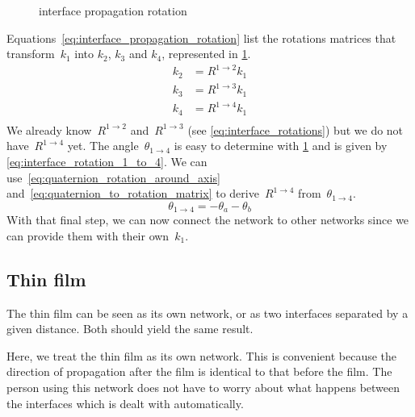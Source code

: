 \begin{figure}[hbtp]
    \centering
    \caption{\label{fig:interface_propagation_rotation}interface propagation rotation}
\end{figure}
Equations~\eqref{eq:interface_propagation_rotation} list the rotations matrices that transform~$k_1$ into $k_2$, $k_3$ and $k_4$, represented in \cref{fig:interface_propagation_rotation}.
\begin{equation}
    \begin{aligned}
        k_2 &= R^{1 \rightarrow 2} k_1 \\
        k_3 &= R^{1 \rightarrow 3} k_1 \\
        k_4 &= R^{1 \rightarrow 4} k_1 \\
    \end{aligned}
    \label{eq:interface_propagation_rotation}
\end{equation}
We already know~$R^{1 \rightarrow 2}$ and~$R^{1 \rightarrow 3}$ (see \cref{eq:interface_rotations}) but we do not have~$R^{1 \rightarrow 4}$ yet.
The angle~$\theta_{1 \rightarrow 4}$ is easy to determine with \cref{fig:interface_propagation_rotation} and is given by \cref{eq:interface_rotation_1_to_4}.
We can use~\cref{eq:quaternion_rotation_around_axis} and~\cref{eq:quaternion_to_rotation_matrix} to derive~$R^{1 \rightarrow 4}$ from~$\theta_{1 \rightarrow 4}$.
\begin{equation}
    \theta_{1 \rightarrow 4} = -\theta_a - \theta_b
    \label{eq:interface_rotation_1_to_4}
\end{equation}
With that final step, we can now connect the network to other networks since we can provide them with their own~$k_1$.



\subsection{Thin film}
The thin film can be seen as its own network, or as two interfaces separated by a given distance.  Both should yield the same result.

Here, we treat the thin film as its own network.
This is convenient because the direction of propagation after the film is identical to that before the film.  The person using this network does not have to worry about what happens between the interfaces which is dealt with automatically.

